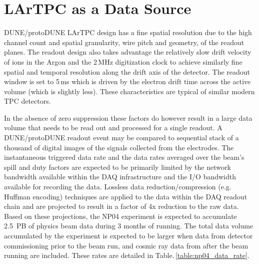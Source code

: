 \documentclass[a4paper]{jpconf}
\newcommand{\pd}{protoDUNE\xspace}
\begin{document}
\section{LArTPC as a Data Source}
\label{sec:np04_data_rate}
DUNE/\pd LArTPC design has a fine spatial resolution due to the high
channel count and spatial granularity, wire pitch and geometry, of the readout
planes.  The readout design also takes advantage the relatively slow
drift velocity of ions in the Argon and the 2\,MHz digitization clock
to achieve similarly fine spatial and temporal resolution along the
drift axis of the detector. The readout window is  set to 5\,ms 
which is driven by the electron drift time across
the active volume (which is slightly less).  These characteristics are typical of
similar modern TPC detectors.

In the absence of zero suppression these factors do however
result in a large data volume that needs to be read out and
processed for a single readout.
A DUNE/\pd readout event may be compared to sequential stack of a thousand of digital
images of the signals collected from the electrodes. 
The instantaneous triggered data rate and the data rates averaged over
the beam's spill and duty factors are expected to be primarily limited
by the network bandwidth available within the DAQ infrastructure and
the I/O bandwidth available for recording the data.  Lossless data
reduction/compression (e.g. Huffman encoding)
techniques are applied to the data within the DAQ readout chain and
are projected to result in a factor of 4x reduction to the raw data.
Based on these projections, the NP04 experiment is expected to accumulate 2.5~PB of physics beam
data during 3 months of running.  The total data volume accumulated by
the experiment is expected to be larger when data from
detector commissioning prior to the beam run, and cosmic ray data from
after the beam running are included.   These rates are detailed in Table.\,\ref{table:np04_data_rate}.
\end{document}
